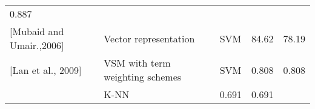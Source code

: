 \documentclass[11pt]{article}
\begin{document}
\begin{longtable}[]{@{}lllll@{}}
\begin{minipage}[t]{0.17\columnwidth}
0.887\strut
\end{minipage}\tabularnewline
\begin{minipage}[t]{0.17\columnwidth}\raggedright\strut
{[}Mubaid and Umair.,2006{]}\strut
\end{minipage} & \begin{minipage}[t]{0.17\columnwidth}\raggedright\strut
Vector representation\strut
\end{minipage} & \begin{minipage}[t]{0.17\columnwidth}\raggedright\strut
SVM\strut
\end{minipage} & \begin{minipage}[t]{0.17\columnwidth}\raggedright\strut
84.62\strut
\end{minipage} & \begin{minipage}[t]{0.17\columnwidth}\raggedright\strut
78.19\strut
\end{minipage}\tabularnewline
\begin{minipage}[t]{0.17\columnwidth}\raggedright\strut
{[}Lan et al., 2009{]}\strut
\end{minipage} & \begin{minipage}[t]{0.17\columnwidth}\raggedright\strut
VSM with term weighting schemes\strut
\end{minipage} & \begin{minipage}[t]{0.17\columnwidth}\raggedright\strut
SVM\strut
\end{minipage} & \begin{minipage}[t]{0.17\columnwidth}\raggedright\strut
0.808\strut
\end{minipage} & \begin{minipage}[t]{0.17\columnwidth}\raggedright\strut
0.808\strut
\end{minipage}\tabularnewline
\begin{minipage}[t]{0.17\columnwidth}\raggedright\strut
\strut
\end{minipage} & \begin{minipage}[t]{0.17\columnwidth}\raggedright\strut
K-NN\strut
\end{minipage} & \begin{minipage}[t]{0.17\columnwidth}\raggedright\strut
0.691\strut
\end{minipage} & \begin{minipage}[t]{0.17\columnwidth}\raggedright\strut
0.691\strut
\end{minipage}\tabularnewline
\bottomrule
\end{longtable}
\end{document}
